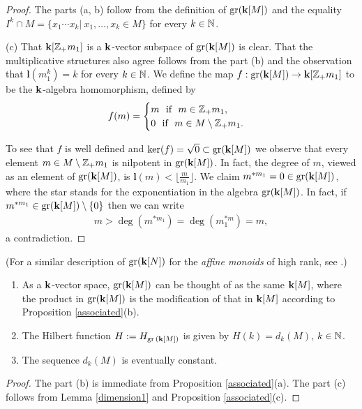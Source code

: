 \begin{proof}
The parts (a, b) follow from the definition of $\operatorname{gr}(\mathbf{k}[M])$ and the equality $I^k\cap M=\{x_1\cdots x_k|\ x_1,\ldots,x_k\in M\}$ for every $k\in\mathbb N$.

\medskip\noindent(c) That $\mathbf{k}[\mathbb Z_+m_1]$ is a $\mathbf{k}$-vector subspace of $\operatorname{gr}(\mathbf{k}[M])$ is clear. That the multiplicative structures also agree follows from the part (b) and the observation that $\textbf{l}(m_1^k)=k$ for every $k\in\mathbb N$. We define the map $f:\operatorname{gr}(\mathbf{k}[M])\to\mathbf{k}[\mathbb Z_+m_1]$ to be the $\mathbf{k}$-algebra homomorphism, defined by
\begin{align*}
f(m)=
\begin{cases}
m\ \ \text{if}\ \ m\in\mathbb Z_+m_1,\\
0\ \ \text{if}\ \ m\in M\setminus\mathbb Z_+m_1.
\end{cases}
\end{align*}

To see that $f$ is well defined and $\ker(f)=\sqrt{0}\subset\operatorname{gr}(\mathbf{k}[M])$ we observe that every element $m\in M\setminus\mathbb Z_+m_1$ is nilpotent in $\operatorname{gr}(\mathbf{k}[M])$. In fact, the degree of $m$, viewed as an element of $\operatorname{gr}(\mathbf{k}[M])$, is $\textbf{l}(m)<\big\lfloor\frac m{m_1}\big\rfloor$. We claim $m^{*m_1}=0\in\operatorname{gr}(\mathbf{k}[M])$, where the star stands for the exponentiation in the algebra $\operatorname{gr}(\mathbf{k}[M])$. In fact, if $m^{*m_1}\in\operatorname{gr}(\mathbf{k}[M])\setminus\{0\}$ then we can write
\begin{align*}
m>\deg(m^{*m_1})=\deg(m_1^{*m})=m,
\end{align*}
a contradiction. 
\end{proof}
\noindent(For a similar description of $\operatorname{gr}(\mathbf{k}[N])$ for the \emph{affine monoids} of high rank, see \cite{Bottom}.)

\begin{corollary}\label{associated_corollary}
\leavevmode
\begin{enumerate}[label=(\alph*)]
\item As a $\mathbf{k}$-vector space, $\operatorname{gr}(\mathbf{k}[M])$ can be thought of as the same $\mathbf{k}[M]$, where the product in $\operatorname{gr}(\mathbf{k}[M])$ is the modification of that in $\mathbf{k}[M]$ according to Proposition \ref{associated}(b).
\item 
The Hilbert function $H:=H_{\operatorname{gr}{(\mathbf{k}[M]})}$ is given by $H(k)=d_k(M)$, $k\in\mathbb N$.
\item The sequence $d_k(M)$ is eventually constant.
\end{enumerate}
\end{corollary}

\begin{proof}
The part (b) is immediate from Proposition \ref{associated}(a). The part (c) follows from  Lemma \ref{dimension1} and Proposition \ref{associated}(c). 
\end{proof}

